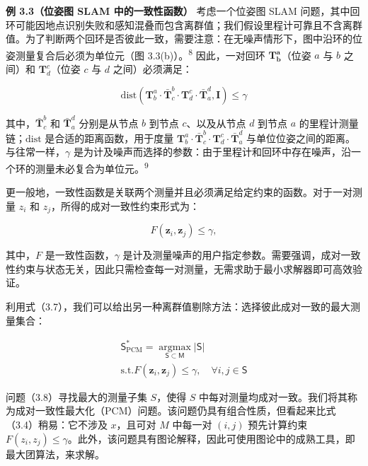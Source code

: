 \textbf{例 3.3（位姿图 SLAM 中的一致性函数）} 考虑一个位姿图 SLAM 问题，其中回环可能因地点识别失败和感知混叠而包含离群值；我们假设里程计可靠且不含离群值。为了判断两个回环是否彼此一致，需要注意：在无噪声情形下，图中沿环的位姿测量复合后必须为单位元（图 3.3(b)）。\textsuperscript{8} 因此，一对回环 $\pmb { T _ { b } ^ { a } }$（位姿 $a$ 与 $b$ 之间）和 $\pmb { T } _ { d } ^ { c }$（位姿 $c$ 与 $d$ 之间）必须满足：

\begin{equation}
\mathrm{dist} (\pmb {T} _ {b} ^ {a} \cdot \bar {\pmb {T}} _ {c} ^ {b} \cdot \pmb {T} _ {d} ^ {c} \cdot \bar {\pmb {T}} _ {a} ^ {d}, \mathbf {I}) \leq \gamma\tag{3.6}
\end{equation}

其中，$\bar { \pmb { T } } _ { c } ^ { b }$ 和 $\bar { \pmb { T } } _ { a } ^ { d }$ 分别是从节点 $b$ 到节点 $c$、以及从节点 $d$ 到节点 $a$ 的里程计测量链；$\mathrm{dist}$ 是合适的距离函数，用于度量 $\pmb { T } _ { b } ^ { a } \cdot \bar { \pmb { T } } _ { c } ^ { b } \cdot \pmb { T } _ { d } ^ { c} \cdot \bar { \pmb { T } } _ { a } ^ { d }$ 与单位位姿之间的距离。与往常一样，$\gamma$ 是为计及噪声而选择的参数：由于里程计和回环中存在噪声，沿一个环的测量未必复合为单位元。\textsuperscript{9}

更一般地，一致性函数是关联两个测量并且必须满足给定约束的函数。对于一对测量 $z _ { i }$ 和 $z _ { j }$，所得的成对一致性约束形式为：

\begin{equation}
F (\boldsymbol {z} _ {i}, \boldsymbol {z} _ {j}) \leq \gamma ,\tag{3.7}
\end{equation}

其中，$F$ 是一致性函数，$\gamma$ 是计及测量噪声的用户指定参数。需要强调，成对一致性约束与状态无关，因此只需检查每一对测量，无需求助于最小求解器即可高效验证。

利用式（3.7），我们可以给出另一种离群值剔除方法：选择彼此成对一致的最大测量集合：

\begin{equation}
\begin{array}{c} \mathsf {S} _ {\mathrm{PCM}} ^ {*} = \underset {\mathsf {S} \subset \mathsf {M}} {\operatorname{argmax}} | \mathsf {S} | \\ \text {s.t.} F (\boldsymbol {z} _ {i}, \boldsymbol {z} _ {j}) \leq \gamma , \quad \forall i, j \in \mathsf {S} \end{array}\tag{3.8}
\end{equation}

问题（3.8）寻找最大的测量子集 $S$，使得 $S$ 中每对测量均成对一致。我们将其称为成对一致性最大化（PCM）问题。该问题仍具有组合性质，但看起来比式（3.4）稍易：它不涉及 $x$，且可对 $M$ 中每一对 $( i , j )$ 预先计算约束 $F ( z _ { i } , z _ { j } ) \leq \gamma$。此外，该问题具有图论解释，因此可使用图论中的成熟工具，即最大团算法，来求解。

